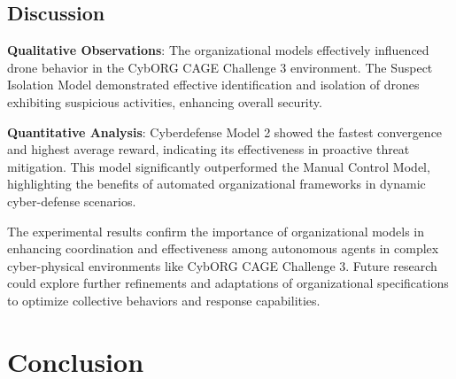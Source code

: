 \documentclass[conference]{IEEEtran}
\newcounter{relation}
\begin{document}
\subsection{Discussion}

\textbf{Qualitative Observations}:
The organizational models effectively influenced drone behavior in the CybORG CAGE Challenge 3 environment. The Suspect Isolation Model demonstrated effective identification and isolation of drones exhibiting suspicious activities, enhancing overall security.

\textbf{Quantitative Analysis}:
Cyberdefense Model 2 showed the fastest convergence and highest average reward, indicating its effectiveness in proactive threat mitigation. This model significantly outperformed the Manual Control Model, highlighting the benefits of automated organizational frameworks in dynamic cyber-defense scenarios.

The experimental results confirm the importance of organizational models in enhancing coordination and effectiveness among autonomous agents in complex cyber-physical environments like CybORG CAGE Challenge 3. Future research could explore further refinements and adaptations of organizational specifications to optimize collective behaviors and response capabilities.



\section{Conclusion}




\end{document}
